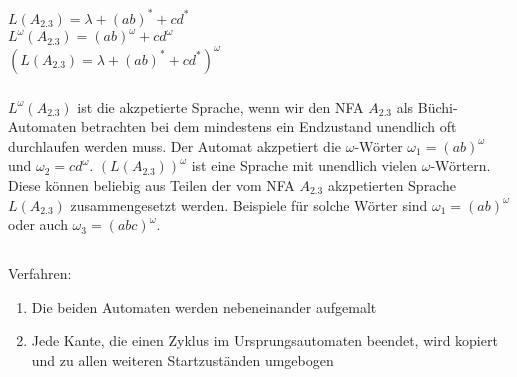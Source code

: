 \documentclass[a4paper,12pt]{scrartcl}
\title{\blatt}
\date{Gruppe 06}
\author{Sabrina Buczko 6663234, Julian Deinert 6535880, Rafael Heid 6704828}
\begin{document}
\maketitle
\newpage
\setcounter{section}{1}
\section{}
\setcounter{subsection}{2}
\subsection{}
\subsubsection{}
$L(A_{2.3})=\lambda+(ab)^*+cd^*$\\
$L^\omega(A_{2.3}) = (ab)^\omega + cd^\omega$\\
$(L(A_{2.3})=\lambda+(ab)^*+cd^*)^\omega$
\subsubsection{}
$L^\omega(A_{2.3})$ ist die akzpetierte Sprache, wenn wir den NFA $A_{2.3}$ als 
Büchi-Automaten betrachten bei dem mindestens ein Endzustand unendlich oft 
durchlaufen werden muss. Der Automat akzpetiert die $\omega$-Wörter $\omega_1 = 
(ab)^\omega$ und $\omega_2 = cd^\omega$. $(L(A_{2.3}))^\omega$ ist eine Sprache 
mit unendlich vielen $\omega$-Wörtern. Diese können beliebig aus Teilen der vom 
NFA $A_{2.3}$ akzpetierten Sprache $L(A_{2.3})$ zusammengesetzt werden. 
Beispiele für solche Wörter sind $\omega_1 = (ab)^\omega$ oder auch $\omega_3 = 
(abc)^\omega$.
\subsubsection{}
\subsection{}
\subsubsection{}
Verfahren:
\begin{enumerate}
\item Die beiden Automaten werden nebeneinander aufgemalt
\item Jede Kante, die einen Zyklus im Ursprungsautomaten beendet, wird kopiert 
und zu allen weiteren Startzuständen umgebogen
\end{enumerate}
\end{document}
